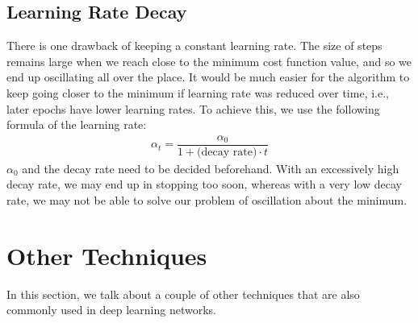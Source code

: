 \documentclass[a4paper, 12pt]{report}
\begin{document}
\section{Learning Rate Decay}
There is one drawback of keeping a constant learning rate. The size of steps remains large when we reach close to the minimum cost function value, and so we end up oscillating all over the place. It would be much easier for the algorithm to keep going closer to the minimum if learning rate was reduced over time, i.e., later epochs have lower learning rates. To achieve this, we use the following formula of the learning rate:
\begin{align*}
\alpha_t = \dfrac{\alpha_0}{1+\text{(decay rate)}\cdot t}
\end{align*}
$\alpha_0$ and the decay rate need to be decided beforehand. With an excessively high decay rate, we may end up in stopping too soon, whereas with a very low decay rate, we may not be able to solve our problem of oscillation about the minimum.


\chapter{Other Techniques}
In this section, we talk about a couple of other techniques that are also commonly used in deep learning networks.
\end{document}
